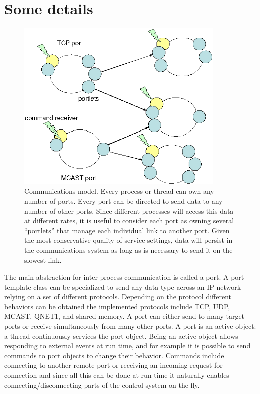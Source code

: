 
\section{Some details}


\begin{figure}[tb]
\centerline{
\includegraphics[width=10cm]{fig-port-portlets}
}
\caption[Interprocess communication model]{ 
%
Communications model.  Every process or thread can own
any number of ports.  Every port can be directed to send
data to any number of other ports.  Since different
processes will access this data at different rates,
it is useful to consider each port as owning several
``portlets'' that manage each individual link to another
port.  Given the most conservative quality of service settings,
data will persist in the communications system 
as long as is necessary to send it on the slowest link.
%
}
\label{fig:yarp-port}
\end{figure}

The main abstraction for inter-process communication is called a
port. A port template class can be specialized to send any data type
across an IP-network relying on a set of different
protocols. Depending on the protocol different behaviors can be
obtained the implemented protocols include TCP, UDP, MCAST, QNET1, and
shared memory. A port can either send to many target ports or receive
simultaneously from many other ports. A port is an active object: a
thread continuously services the port object. Being an active object
allows responding to external events at run time, and for example it
is possible to send commands to port objects to change their
behavior. Commands include connecting to another remote port or
receiving an incoming request for connection and since all this can be
done at run-time it naturally enables connecting/disconnecting parts
of the control system on the fly.


